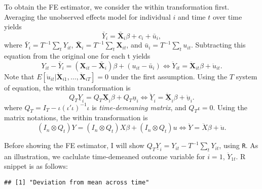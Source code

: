 \documentclass[
  12pt,
]{article}
\newenvironment{Shaded}{\begin{snugshade}}{\end{snugshade}}
\newcommand{\CommentTok}[1]{\textcolor[rgb]{0.56,0.35,0.01}{\textit{#1}}}
\newcommand{\DecValTok}[1]{\textcolor[rgb]{0.00,0.00,0.81}{#1}}
\newcommand{\KeywordTok}[1]{\textcolor[rgb]{0.13,0.29,0.53}{\textbf{#1}}}
\newcommand{\NormalTok}[1]{#1}
\newcommand{\OperatorTok}[1]{\textcolor[rgb]{0.81,0.36,0.00}{\textbf{#1}}}
\newcommand{\StringTok}[1]{\textcolor[rgb]{0.31,0.60,0.02}{#1}}
\begin{document}
To obtain the FE estimator, we consider the within transformation first.
Averaging the unobserved effects model for individual \(i\) and time \(t\) over time yields
\[
  \bar{Y}_i = \bar{\mathbf{X}}_i \beta + c_i + \bar{u}_i,
\]
where \(\bar{Y}_i = T^{-1} \sum_t Y_{it}\), \(\bar{\mathbf{X}}_i = T^{-1} \sum_t \mathbf{X}_{it}\),
and \(\bar{u}_i = T^{-1} \sum_t u_{it}\).
Subtracting this equation from the original one for each t yields
\[
  Y_{it} - \bar{Y}_i = (\mathbf{X}_{it} - \bar{\mathbf{X}}_i) \beta + (u_{it} - \bar{u}_i)
  \Leftrightarrow
  \ddot{Y}_{it} = \ddot{\mathbf{X}}_{it} \beta + \ddot{u}_{it}.
\]
Note that \(E[\ddot{u}_{it} | \ddot{\mathbf{X}}_{i1}, \ldots, \ddot{\mathbf{X}}_{iT}] = 0\)
under the first assumption.
Using the \(T\) system of equation, the within transformation is
\[
  Q_T \underline{Y}_i = Q_T \underline{\mathbf{X}}_i \beta + Q_T \underline{u}_i
  \Leftrightarrow
  \ddot{\underline{Y}}_i = \ddot{\underline{\mathbf{X}}}_i \beta + \ddot{\underline{u}}_i.
\]
where \(Q_T = I_T - \iota (\iota' \iota)^{-1} \iota\) is \emph{time-demeaning matrix}, and \(Q_T \iota = 0\).
Using the matrix notations, the within transformation is
\[
  (I_n \otimes Q_t) Y = (I_n \otimes Q_t) X \beta + (I_n \otimes Q_t) u
  \Leftrightarrow
  \ddot{Y} = \ddot{X} \beta + \ddot{u}.
\]

Before showing the FE estimator,
I will show \(Q_T \underline{Y}_i = Y_{it} - T^{-1} \sum_t Y_{it}\),
using \texttt{R}.
As an illustration, we caclulate time-demeaned outcome variable for \(i = 1\), \(\ddot{Y}_{1t}\).
R snippet is as follows:

\begin{Shaded}
\end{Shaded}

\begin{verbatim}
## [1] "Deviation from mean across time"
\end{verbatim}
\end{document}
